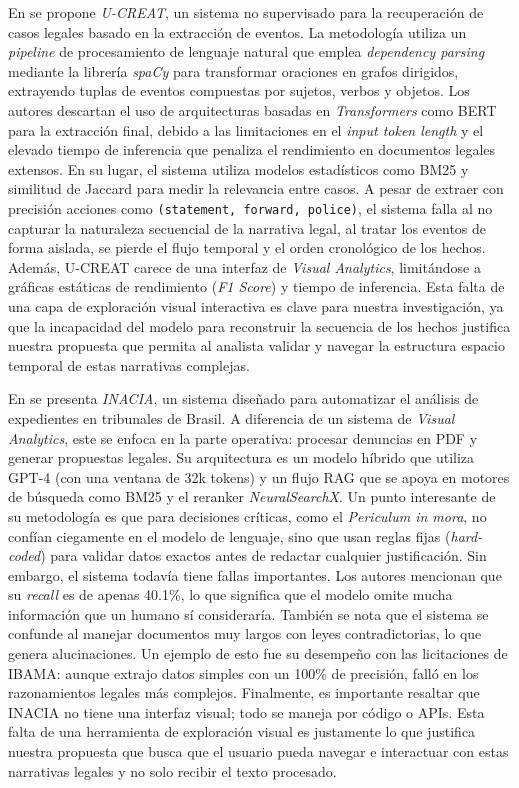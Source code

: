 En \cite{joshi2023ucreat} se propone \textit{U-CREAT}, un sistema no supervisado para la recuperación de casos legales basado en la extracción de eventos. La metodología utiliza un \textit{pipeline} de procesamiento de lenguaje natural que emplea \textit{dependency parsing} mediante la librería \textit{spaCy} para transformar oraciones en grafos dirigidos, extrayendo tuplas de eventos compuestas por sujetos, verbos y objetos. Los autores descartan el uso de arquitecturas basadas en \textit{Transformers} como \acs{BERT} para la extracción final, debido a las limitaciones en el \textit{input token length} y el elevado tiempo de inferencia que penaliza el rendimiento en documentos legales extensos. En su lugar, el sistema utiliza modelos estadísticos como \ac{BM25} y similitud de Jaccard para medir la relevancia entre casos. A pesar de extraer con precisión acciones como \texttt{(statement, forward, police)}, el sistema falla al no capturar la naturaleza secuencial de la narrativa legal, al tratar los eventos de forma aislada, se pierde el flujo temporal y el orden cronológico de los hechos. Además, U-CREAT carece de una interfaz de \textit{Visual Analytics}, limitándose a gráficas estáticas de rendimiento (\textit{F1 Score}) y tiempo de inferencia. Esta falta de una capa de exploración visual interactiva es clave para nuestra investigación, ya que la incapacidad del modelo para reconstruir la secuencia de los hechos justifica nuestra propuesta que permita al analista validar y navegar la estructura espacio temporal de estas narrativas complejas.

En \cite{pereira2023inacia} se presenta \textit{INACIA}, un sistema diseñado para automatizar el análisis de expedientes en tribunales de Brasil. A diferencia de un sistema de \textit{Visual Analytics}, este se enfoca en la parte operativa: procesar denuncias en \ac{PDF} y generar propuestas legales. Su arquitectura es un modelo híbrido que utiliza GPT-4 (con una ventana de 32k tokens) y un flujo \ac{RAG} que se apoya en motores de búsqueda como \acs{BM25} y el reranker \textit{NeuralSearchX}. Un punto interesante de su metodología es que para decisiones críticas, como el \textit{Periculum in mora}, no confían ciegamente en el modelo de lenguaje, sino que usan reglas fijas (\textit{hard-coded}) para validar datos exactos antes de redactar cualquier justificación. Sin embargo, el sistema todavía tiene fallas importantes. Los autores mencionan que su \textit{recall} es de apenas 40.1\%, lo que significa que el modelo omite mucha información que un humano sí consideraría. También se nota que el sistema se confunde al manejar documentos muy largos con leyes contradictorias, lo que genera alucinaciones. Un ejemplo de esto fue su desempeño con las licitaciones de IBAMA: aunque extrajo datos simples con un 100\% de precisión, falló en los razonamientos legales más complejos. Finalmente, es importante resaltar que INACIA no tiene una interfaz visual; todo se maneja por código o \acp{API}. Esta falta de una herramienta de exploración visual es justamente lo que justifica nuestra propuesta que busca que el usuario pueda navegar e interactuar con estas narrativas legales y no solo recibir el texto procesado.





